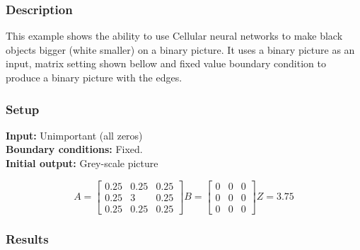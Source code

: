 \subsubsection{Description}
This example shows the ability to use Cellular neural networks to make black objects bigger (white smaller) on a binary picture. It uses a binary picture as an input, matrix setting shown bellow and fixed value boundary condition to produce a binary picture with the edges.
\subsubsection{Setup}

\textbf{Input:} Unimportant (all zeros)\\
\textbf{Boundary conditions:} Fixed.\\
\textbf{Initial output:} Grey-scale picture

\begin{minipage}{0.9\linewidth}
\begin{equation}
A =
\begin{bmatrix}
 0.25 &  0.25 &  0.25 \\
  0.25 &  3 &  0.25 \\
  0.25 &  0.25 &  0.25
\end{bmatrix}
B =
\begin{bmatrix}
 0 & 0 & 0 \\
 0 & 0 & 0 \\
 0 & 0 & 0
\end{bmatrix}
Z = 3.75
\end{equation}
\end{minipage}

\subsubsection{Results}


